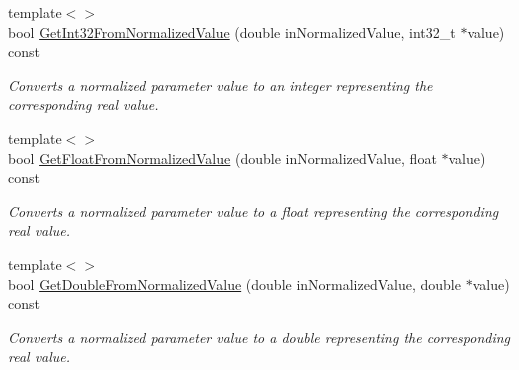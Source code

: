 \begin{DoxyCompactItemize}
{\footnotesize template$<$$>$ }\\bool \mbox{\hyperlink{a01537_ad38f15504ff550f19fb9a18a56960cfe}{Get\+Int32\+From\+Normalized\+Value}} (double in\+Normalized\+Value, int32\+\_\+t $\ast$value) const
\begin{DoxyCompactList}\small\item\em Converts a normalized parameter value to an integer representing the corresponding real value. \end{DoxyCompactList}\item 
{\footnotesize template$<$$>$ }\\bool \mbox{\hyperlink{a01537_aa5ba79df5fd472494ec127372498b48c}{Get\+Float\+From\+Normalized\+Value}} (double in\+Normalized\+Value, float $\ast$value) const
\begin{DoxyCompactList}\small\item\em Converts a normalized parameter value to a float representing the corresponding real value. \end{DoxyCompactList}\item 
{\footnotesize template$<$$>$ }\\bool \mbox{\hyperlink{a01537_a75290a4d4e7781cbcf4af56aff8be693}{Get\+Double\+From\+Normalized\+Value}} (double in\+Normalized\+Value, double $\ast$value) const
\begin{DoxyCompactList}\small\item\em Converts a normalized parameter value to a double representing the corresponding real value. \end{DoxyCompactList}\end{DoxyCompactItemize}

